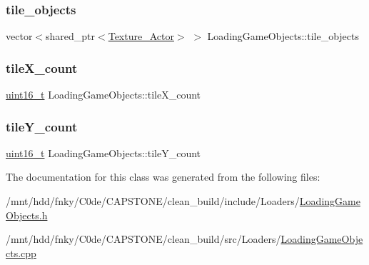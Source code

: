 \mbox{\label{classLoadingGameObjects_aa25d44773be9d0a524273f227501bd82}} 
\subsubsection{\texorpdfstring{tile\+\_\+objects}{tile\_objects}}
{\footnotesize\ttfamily vector$<$shared\+\_\+ptr$<$\hyperlink{classTexture__Actor}{Texture\+\_\+\+Actor}$>$ $>$ Loading\+Game\+Objects\+::tile\+\_\+objects\hspace{0.3cm}{\ttfamily [private]}}

\mbox{\label{classLoadingGameObjects_af6f32e0af9f744e1c9c1c9858e55aa01}} 
\subsubsection{\texorpdfstring{tile\+X\+\_\+count}{tileX\_count}}
{\footnotesize\ttfamily \hyperlink{stdint_8h_a273cf69d639a59973b6019625df33e30}{uint16\+\_\+t} Loading\+Game\+Objects\+::tile\+X\+\_\+count\hspace{0.3cm}{\ttfamily [private]}}

\mbox{\label{classLoadingGameObjects_a495a78b57ba4ae5d3932dd2b12496d59}} 
\subsubsection{\texorpdfstring{tile\+Y\+\_\+count}{tileY\_count}}
{\footnotesize\ttfamily \hyperlink{stdint_8h_a273cf69d639a59973b6019625df33e30}{uint16\+\_\+t} Loading\+Game\+Objects\+::tile\+Y\+\_\+count\hspace{0.3cm}{\ttfamily [private]}}



The documentation for this class was generated from the following files\+:\begin{DoxyCompactItemize}
\item 
/mnt/hdd/fnky/\+C0de/\+C\+A\+P\+S\+T\+O\+N\+E/clean\+\_\+build/include/\+Loaders/\hyperlink{LoadingGameObjects_8h}{Loading\+Game\+Objects.\+h}\item 
/mnt/hdd/fnky/\+C0de/\+C\+A\+P\+S\+T\+O\+N\+E/clean\+\_\+build/src/\+Loaders/\hyperlink{LoadingGameObjects_8cpp}{Loading\+Game\+Objects.\+cpp}\end{DoxyCompactItemize}
